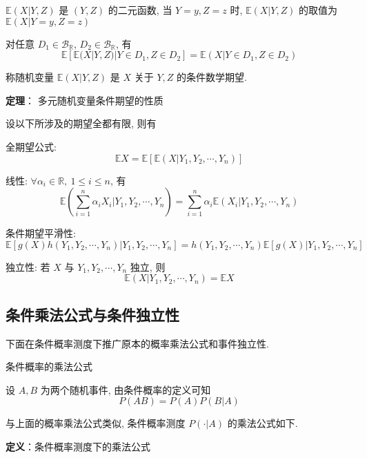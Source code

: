 \documentclass[openany]{ctexbook}
\theoremstyle{kaiti}
\theoremstyle{normal}
\begin{document}
 $\mathbb{E}(X|Y,Z)$ 是 $(Y,Z)$ 的二元函数, 当 $Y=y,Z=z$ 时, $\mathbb{E}(X|Y,Z)$ 的取值为 $\mathbb{E}(X|Y=y,Z=z)$

 对任意 $D_1\in\mathcal{B}_{\mathbb{R}}$, $D_2\in\mathcal{B}_{\mathbb{R}}$, 有
\begin{equation}
  \mathbb{E}[\mathbb{E}(X|Y,Z)|Y\in D_1,Z\in D_2]=\mathbb{E}(X|Y\in D_1,Z\in D_2)
\end{equation}
 

称随机变量 $\mathbb{E}(X|Y,Z)$ 是 $X$ 关于 $Y,Z$ 的条件数学期望.

\textbf{定理}： 多元随机变量条件期望的性质

设以下所涉及的期望全都有限, 则有

全期望公式:
\begin{equation}
  \mathbb{E}X=\mathbb{E}[\mathbb{E}(X|Y_1,Y_2,\cdots,Y_n)]
\end{equation}


线性: $\forall \alpha_i\in\mathbb{R},~1\leqslant i\leqslant n$, 有
\begin{equation}
  \mathbb{E}\left(\sum_{i=1}^n\alpha_iX_i\Big|Y_1,Y_2,\cdots,Y_n\right)=\sum_{i=1}^n\alpha_i\mathbb{E}(X_i|Y_1,Y_2,\cdots,Y_n)
\end{equation}


条件期望平滑性:
\begin{equation}
  \mathbb{E}[g(X)h(Y_1,Y_2,\cdots,Y_n)|Y_1,Y_2,\cdots,Y_n]=h(Y_1,Y_2,\cdots,Y_n)\mathbb{E}[g(X)|Y_1,Y_2,\cdots,Y_n]
\end{equation}


独立性: 若 $X$ 与 $Y_1,Y_2,\cdots,Y_n$ 独立, 则
\begin{equation}
  \mathbb{E}(X|Y_1,Y_2,\cdots,Y_n)=\mathbb{E}X
\end{equation}


\subsection{条件乘法公式与条件独立性}

下面在条件概率测度下推广原本的概率乘法公式和事件独立性.

条件概率的乘法公式

设 $A,B$ 为两个随机事件, 由条件概率的定义可知
\begin{equation}
  P(AB)=P(A)P(B|A)
\end{equation}

与上面的概率乘法公式类似, 条件概率测度 $P(\cdot|A)$ 的乘法公式如下. 

\textbf{定义}：条件概率测度下的乘法公式
\end{document}

